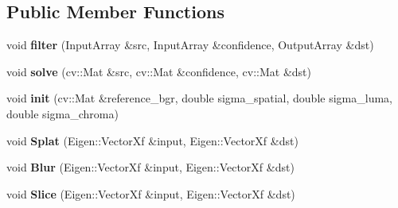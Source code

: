 \subsection*{Public Member Functions}
\begin{DoxyCompactItemize}
\item 
void {\bfseries filter} (Input\+Array \&src, Input\+Array \&confidence, Output\+Array \&dst)\hypertarget{classcv_1_1xim_1_1FastBilateralSolverFilterImpl_a660539579f1037e0725732afca096aa6}{}\label{classcv_1_1xim_1_1FastBilateralSolverFilterImpl_a660539579f1037e0725732afca096aa6}

\item 
void {\bfseries solve} (cv\+::\+Mat \&src, cv\+::\+Mat \&confidence, cv\+::\+Mat \&dst)\hypertarget{classcv_1_1xim_1_1FastBilateralSolverFilterImpl_a27d02f3df6c11dd6304ef054ff63ab97}{}\label{classcv_1_1xim_1_1FastBilateralSolverFilterImpl_a27d02f3df6c11dd6304ef054ff63ab97}

\item 
void {\bfseries init} (cv\+::\+Mat \&reference\+\_\+bgr, double sigma\+\_\+spatial, double sigma\+\_\+luma, double sigma\+\_\+chroma)\hypertarget{classcv_1_1xim_1_1FastBilateralSolverFilterImpl_a3ab6f356d5d0144603df413f50c1a065}{}\label{classcv_1_1xim_1_1FastBilateralSolverFilterImpl_a3ab6f356d5d0144603df413f50c1a065}

\item 
void {\bfseries Splat} (Eigen\+::\+Vector\+Xf \&input, Eigen\+::\+Vector\+Xf \&dst)\hypertarget{classcv_1_1xim_1_1FastBilateralSolverFilterImpl_ac59559b02ff6c5a38aa6267ac4022b4b}{}\label{classcv_1_1xim_1_1FastBilateralSolverFilterImpl_ac59559b02ff6c5a38aa6267ac4022b4b}

\item 
void {\bfseries Blur} (Eigen\+::\+Vector\+Xf \&input, Eigen\+::\+Vector\+Xf \&dst)\hypertarget{classcv_1_1xim_1_1FastBilateralSolverFilterImpl_a19104a1f829466a4f8fdacbb508e2029}{}\label{classcv_1_1xim_1_1FastBilateralSolverFilterImpl_a19104a1f829466a4f8fdacbb508e2029}

\item 
void {\bfseries Slice} (Eigen\+::\+Vector\+Xf \&input, Eigen\+::\+Vector\+Xf \&dst)\hypertarget{classcv_1_1xim_1_1FastBilateralSolverFilterImpl_ab7f469c0e32d5c694d3f9ed75c2896b0}{}\label{classcv_1_1xim_1_1FastBilateralSolverFilterImpl_ab7f469c0e32d5c694d3f9ed75c2896b0}

\end{DoxyCompactItemize}
